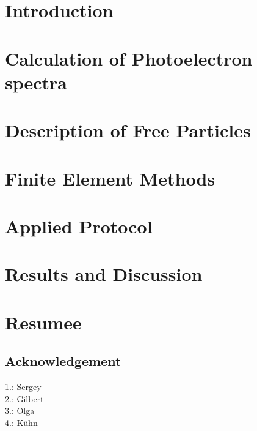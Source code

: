 \documentclass[12pt,a4paper,oneside]{book}
\begin{document}
\chapter{Introduction} %


\chapter{Calculation of Photoelectron spectra}


\chapter{Description of Free Particles} 


\chapter{Finite Element Methods}


\chapter{Applied Protocol}


\chapter{Results and Discussion}


\chapter{Resumee}


\newpage
\section*{Acknowledgement}
1.: Sergey\\
2.: Gilbert\\
3.: Olga\\
4.: K\"uhn

\small{
\printbibliography
}
\end{document}
